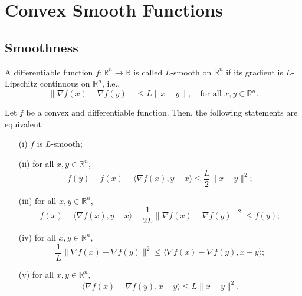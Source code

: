 %
\section{Convex Smooth Functions}

\subsection{Smoothness}

\begin{definition}
  \label{def:l_smooth}
  \leanok
  A differentiable function $f: \mathbb{R}^n \to \mathbb{R}$ is called $L$-smooth on $\mathbb{R}^n$ if its gradient is $L$-Lipschitz continuous on $\mathbb{R}^n$, i.e.,
  \[
    \|\nabla f(x) - \nabla f(y)\| \leq L\|x - y\|, \quad \text{for all } x, y \in \mathbb{R}^n.
  \]
\end{definition}

\begin{lemma}
  \label{lem:smooth_characterizations}
  \leanok
  Let $f$ be a convex and differentiable function. Then, the following statements are equivalent:
  \begin{enumerate}
    \item[(i)] $f$ is $L$-smooth;
    \item[(ii)] for all $x, y \in \mathbb{R}^n$,
    \[
      f(y) - f(x) - \langle\nabla f(x), y - x\rangle \leq \frac{L}{2}\|x - y\|^2;
    \]
    \item[(iii)] for all $x, y \in \mathbb{R}^n$,
    \[
      f(x) + \langle\nabla f(x), y - x\rangle + \frac{1}{2L}\|\nabla f(x) - \nabla f(y)\|^2 \leq f(y);
    \]
    \item[(iv)] for all $x, y \in \mathbb{R}^n$,
    \[
      \frac{1}{L}\|\nabla f(x) - \nabla f(y)\|^2 \leq \langle\nabla f(x) - \nabla f(y), x - y\rangle;
    \]
    \item[(v)] for all $x, y \in \mathbb{R}^n$,
    \[
      \langle\nabla f(x) - \nabla f(y), x - y\rangle \leq L\|x - y\|^2.
    \]
  \end{enumerate}
\end{lemma}

